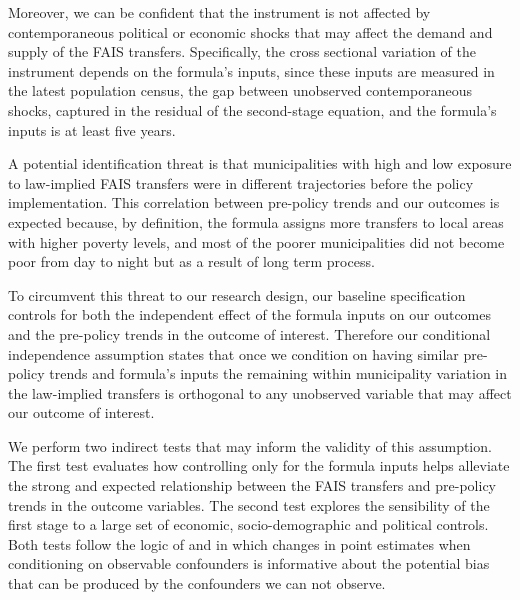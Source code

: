 \documentclass[dv_diss_main.tex]{subfiles}
\begin{document}
Moreover, we can be confident that the instrument is not affected by contemporaneous political or economic shocks that may affect the demand and supply of the FAIS transfers. Specifically, the cross sectional variation of the instrument depends on the formula's inputs, since these inputs are measured in the latest population census, the gap between unobserved contemporaneous shocks, captured in the residual of the second-stage equation, and the formula's inputs is at least five years. 

A potential identification threat is that municipalities with high and low exposure to law-implied FAIS transfers were in different trajectories before the policy implementation. This correlation between pre-policy trends and our outcomes is expected because, by definition, the formula assigns more transfers to local areas with higher poverty levels, and most of the poorer municipalities did not become poor from day to night but as a result of long term process. 

To circumvent this threat to our research design, our baseline specification controls for both the independent effect of the formula inputs on our outcomes and the pre-policy trends in the outcome of interest. Therefore our conditional independence assumption states that once we condition on having similar pre-policy trends and formula's inputs the remaining within municipality variation in the law-implied transfers is orthogonal to any unobserved variable that may affect our outcome of interest.

We perform two indirect tests that may inform the validity of this assumption. The first test evaluates how controlling only for the formula inputs helps alleviate the strong and expected relationship between the FAIS transfers and pre-policy trends in the outcome variables. The second test explores the sensibility of the first stage to a large set of economic, socio-demographic and political controls. Both tests follow the logic of \cite{altonji2005selection} and \cite{oster2019unobservable} in which changes in point estimates when conditioning on observable confounders is informative about the potential bias that can be produced by the confounders we can not observe.  
\end{document}
